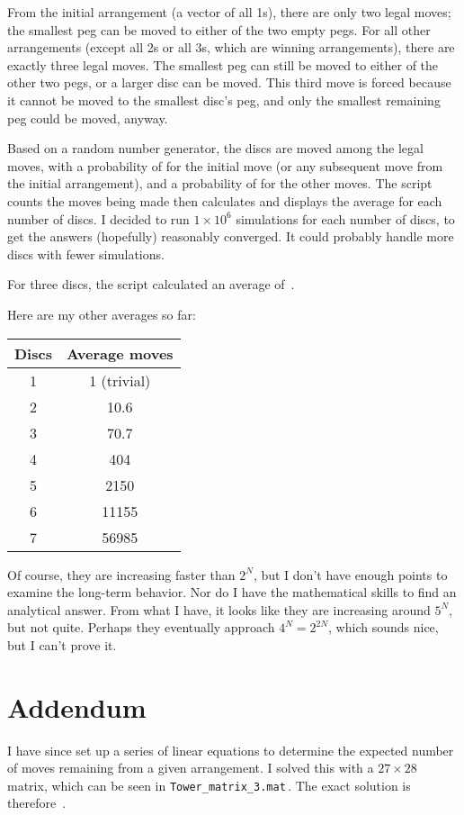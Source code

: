 \documentclass{article}
\begin{document}
From the initial arrangement (a vector of all 1s), there are only two legal moves; the smallest peg can be moved to either of the two empty pegs.
For all other arrangements (except all 2s or all 3s, which are winning arrangements), there are exactly three legal moves.
The smallest peg can still be moved to either of the other two pegs, or a larger disc can be moved.
This third move is forced because it cannot be moved to the smallest disc's peg, and only the smallest remaining peg could be moved, anyway.

Based on a random number generator, the discs are moved among the legal moves, with a probability of  for the initial move (or any subsequent move from the initial arrangement), and a probability of  for the other moves.
The script counts the moves being made then calculates and displays the average for each number of discs.
I decided to run $1\times10^{6}$ simulations for each number of discs, to get the answers (hopefully) reasonably converged.
It could probably handle more discs with fewer simulations.

For three discs, the script calculated an average of
\,.

Here are my other averages so far:

\begin{center}
\begin{tabular}{cc}
\textbf{Discs} & \textbf{Average moves} \\
\hline
1 & 1 (trivial) \\
2 & 10.6 \\
3 & 70.7 \\
4 & 404 \\
5 & 2150 \\
6 & 11155 \\
7 & 56985
\end{tabular}
\end{center}

Of course, they are increasing faster than $2^{N}$, but I don't have enough points to examine the long-term behavior.
Nor do I have the mathematical skills to find an analytical answer.
From what I have, it looks like they are increasing around $5^{N}$, but not quite.
Perhaps they eventually approach $4^{N}=2^{2N}$, which sounds nice, but I can't prove it.


\section*{Addendum}

I have since set up a series of linear equations to determine the expected number of moves remaining from a given arrangement.
I solved this with a $27\times28$ matrix, which can be seen in \texttt{Tower\_matrix\_3.mat}\,.
The exact solution is therefore
\,.
\end{document}
